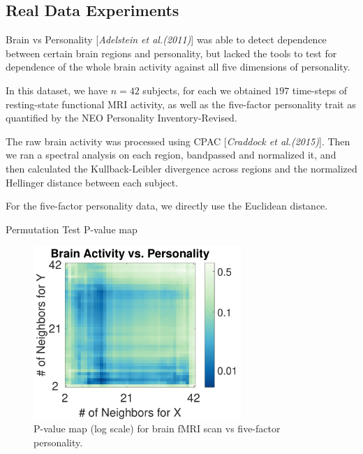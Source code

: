 \documentclass{beamer}
\begin{document}
\subsection{Real Data Experiments}
\begin{frame}{Brain vs Personality}
[\textit{Adelstein et al.(2011)}] \cite{AdelsteinEtAl2011} was able to detect dependence between certain brain regions and personality, but lacked the tools to test for dependence of the whole brain activity against all five dimensions of personality. 

\pause
\medskip 
In this dataset, we have $n=42$ subjects, for each we obtained  $197$ time-steps of resting-state functional MRI activity, as well as the five-factor personality trait as quantified by  the NEO Personality Inventory-Revised. 

\pause
\medskip 
The raw brain activity was processed using CPAC [\textit{Craddock et al.(2015)}]\cite{CPAC2015}. Then we ran a spectral analysis on each region, bandpassed and normalized it, and then calculated the Kullback-Leibler divergence across regions and the normalized Hellinger distance between each subject.  

\pause
\medskip 
For the five-factor personality data, we directly use the Euclidean distance.
\end{frame}

\begin{frame}{Permutation Test P-value map}
\begin{figure}[htbp]
\includegraphics[width=0.7\textwidth]{../Figures/FigReal1}
\caption{P-value map (log scale) for brain fMRI scan vs five-factor personality.}
\label{f:realA}
\end{figure}
\end{frame}
\end{document}
